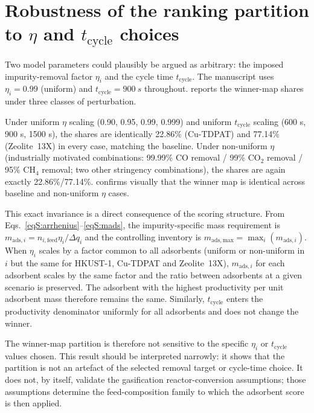 \documentclass[11pt,a4paper]{article}
\begin{document}
\FloatBarrier
\section{Robustness of the ranking partition to $\eta$ and $t_{\mathrm{cycle}}$ choices}
\label{secS:robustness}

Two model parameters could plausibly be argued as arbitrary: the imposed
impurity-removal factor $\eta_i$ and the cycle time $t_{\mathrm{cycle}}$.
The manuscript uses $\eta_i = 0.99$ (uniform) and $t_{\mathrm{cycle}} =
\SI{900}{s}$ throughout.  reports the winner-map
shares under three classes of perturbation.

Under uniform $\eta$ scaling (0.90, 0.95, 0.99, 0.999) and uniform
$t_{\mathrm{cycle}}$ scaling (600 s, 900 s, 1500 s), the shares are
identically 22.86\% (Cu-TDPAT) and 77.14\% (Zeolite~13X) in every case,
matching the baseline. Under non-uniform $\eta$ (industrially motivated
combinations: 99.99\% CO removal / 99\% CO$_2$ removal / 95\% CH$_4$
removal; two other stringency combinations), the shares are again exactly
22.86\%/77.14\%.  confirms visually that the
winner map is identical across baseline and non-uniform $\eta$ cases.

This exact invariance is a direct consequence of the scoring structure.
From Eqs.~\eqref{eqS:arrhenius}--\eqref{eqS:mads}, the impurity-specific
mass requirement is $m_{\mathrm{ads},i} = n_{i,\mathrm{feed}}\eta_i /
\Delta q_i$ and the controlling inventory is $m_{\mathrm{ads,max}} =
\max_i(m_{\mathrm{ads},i})$. When $\eta_i$ scales by a factor common to
all adsorbents (uniform or non-uniform in $i$ but the same for HKUST-1,
Cu-TDPAT and Zeolite~13X), $m_{\mathrm{ads},i}$ for each adsorbent scales
by the same factor and the ratio between adsorbents at a given scenario
is preserved. The adsorbent with the highest productivity per unit
adsorbent mass therefore remains the same. Similarly, $t_{\mathrm{cycle}}$
enters the productivity denominator uniformly for all adsorbents and does
not change the winner.

The winner-map partition is therefore not sensitive to the specific
$\eta_i$ or $t_{\mathrm{cycle}}$ values chosen. This result should be
interpreted narrowly: it shows that the partition is not an artefact of the
selected removal target or cycle-time choice. It does not, by itself, validate
the gasification reactor-conversion assumptions; those assumptions determine
the feed-composition family to which the adsorbent score is then applied.
\end{document}
